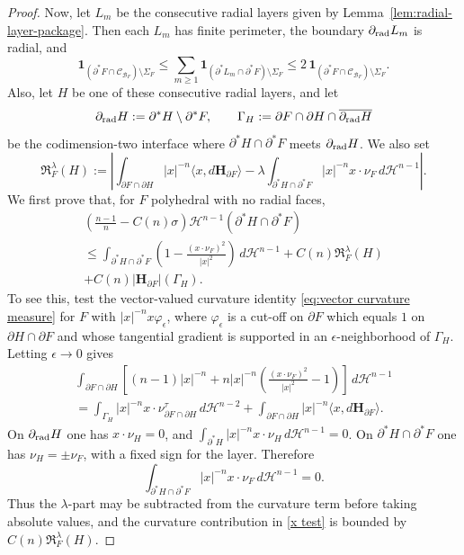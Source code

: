 \documentclass[reqno,11pt]{amsart}
\def\ez{\epsilon}
\def\sz{\sigma}
\newcommand{\HH}{\mathscr H}
\numberwithin{equation}{section}
\theoremstyle{remark}
\begin{document}
\begin{proof}
Now, let $L_m$ be the consecutive radial layers given by
Lemma~\ref{lem:radial-layer-package}. Then each $L_m$ has finite perimeter,
the boundary $\partial_{\rm rad}L_m$ is radial, and
\[
\mathbf 1_{(\partial^*F\cap\mathcal C_{\mathcal B_F})\setminus\Sigma_F}
\le
\sum_{m\ge1}\mathbf 1_{(\partial^*L_m\cap\partial^*F)\setminus\Sigma_F}
\le
2\,\mathbf 1_{(\partial^*F\cap\mathcal C_{\mathcal B_F})\setminus\Sigma_F}.
\]
Also, let $H$ be one of these consecutive radial layers, and let
\[
\partial_{\rm rad}H:=\partial^*H\setminus\partial^*F,
\qquad
\Gamma_H:=\partial F\cap\partial H\cap
\overline{\partial_{\rm rad}H}
\]
be the codimension-two interface where $\partial^*H\cap\partial^*F$ meets
$\partial_{\rm rad}H$. We
also set
\[
\mathfrak R_F^\lambda(H):=
\left|
\int_{\partial F\cap\partial H}|x|^{-n}\langle x,d\mathbf H_{\partial F}\rangle
-\lambda\int_{\partial^*H\cap\partial^*F}|x|^{-n}x\cdot\nu_F\,d\HH^{n-1}
\right|.
\]
We first prove that, for $F$ polyhedral with no radial faces,
\begin{multline}\label{mean curvature control polyhedron}
\left(\frac{n-1}{n}-C(n)\sz\right)\HH^{n-1}(\partial^*H\cap\partial^*F)\\
\le
\int_{\partial^*H\cap\partial^*F}
\left(1-\frac{(x\cdot\nu_F)^2}{|x|^2}\right)\,d\HH^{n-1}
+C(n)\mathfrak R_F^\lambda(H)\\
+C(n)|\mathbf H_{\partial F}|(\Gamma_H).
\end{multline}
To see this, test the vector-valued curvature identity
\eqref{eq:vector curvature measure} for $F$ with $|x|^{-n}x\varphi_\ez$,
where $\varphi_\ez$ is a cut-off on $\partial F$
which equals $1$ on $\partial H\cap\partial F$ and whose tangential gradient is
supported in an $\ez$-neighborhood of $\Gamma_H$.  Letting
$\ez\to0$ gives
\begin{multline}
\int_{\partial F\cap\partial H}
\left[(n-1)|x|^{-n}
+n|x|^{-n}\left(\frac{(x\cdot\nu_F)^2}{|x|^2}-1\right)\right]\,d\HH^{n-1}
\\
 =
\int_{\Gamma_H}
|x|^{-n}x\cdot\nu^\tau_{\partial F\cap\partial H}\,d\HH^{n-2}
+\int_{\partial F\cap\partial H}|x|^{-n}\langle x,d\mathbf H_{\partial F}\rangle .
\label{x test}
\end{multline}
On $\partial_{\rm rad}H$ one has
$x\cdot\nu_H=0$, and
$\int_{\partial^*H}|x|^{-n}x\cdot\nu_H\,d\HH^{n-1}=0$.  On
$\partial^*H\cap\partial^*F$ one has $\nu_H=\pm\nu_F$, with a fixed sign for
the layer.  Therefore
\[
\int_{\partial^*H\cap\partial^*F}|x|^{-n}x\cdot\nu_F\,d\HH^{n-1}=0.
\]
Thus the $\lambda$-part may be subtracted from the curvature term before taking
absolute values, and the curvature contribution in \eqref{x test} is bounded
by $C(n)\mathfrak R_F^\lambda(H)$.


\end{proof}
\end{document}
